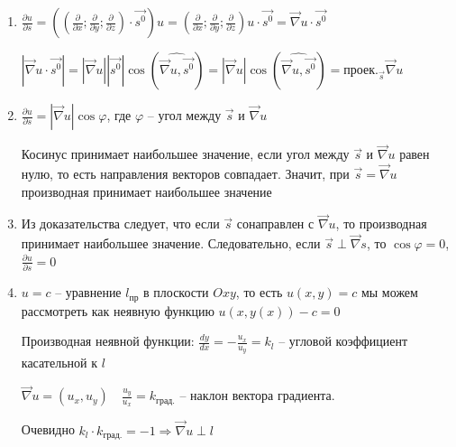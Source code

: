 \documentclass[12pt]{article}
\begin{document}
    \begin{enumerate}
        \item \begin{MyProof}
            $\frac{\partial u}{\partial s} = \left(\left(\frac{\partial}{\partial x}; \frac{\partial}{\partial y}; \frac{\partial}{\partial z}\right) \cdot \vec{s^0}\right) u = \left(\frac{\partial}{\partial x}; \frac{\partial}{\partial y}; \frac{\partial}{\partial z}\right) u \cdot \vec{s^0} =
            \vec\nabla u \cdot \vec{s^0}$
            
            $|\vec\nabla u \cdot \vec{s^0}| = |\vec\nabla u| |\vec{s^0}| \cos(\widehat{\vec\nabla u, \vec{s^0}}) =
            |\vec\nabla u| \cos(\widehat{\vec\nabla u, \vec{s^0}}) = \text{проек.}_{\vec{s}} \vec\nabla u$
        \end{MyProof}

        \item \begin{MyProof}
            $\frac{\partial u}{\partial s} = |\vec\nabla u| \cos\varphi$, где $\varphi$ -- угол между $\vec{s}$ и $\vec\nabla u$

            Косинус принимает наибольшее значение, если угол между $\vec{s}$ и $\vec\nabla u$ равен нулю, то есть направления векторов совпадает. Значит, при $\vec{s} = \vec\nabla u$ производная принимает наибольшее значение
        \end{MyProof}

        \item \begin{MyProof}
            Из доказательства  следует, что если $\vec{s}$ сонаправлен с $\vec\nabla u$, то производная принимает наибольшее значение. Следовательно, если $\vec{s} \perp \vec\nabla s$, то $\cos\varphi = 0$, $\frac{\partial u}{\partial s} = 0$
        \end{MyProof}

        \item \begin{MyProof}
            $u = c$ -- уравнение $l_{\text{пр}}$ в плоскости $Oxy$, то есть $u(x, y) = c$ мы можем рассмотреть как неявную функцию $u(x, y(x)) - c = 0$

            Производная неявной функции: $\frac{dy}{dx} = -\frac{u_x}{u_y} = k_l$ -- угловой коэффициент касательной к $l$

            $\vec\nabla u = (u_x, u_y) \quad \frac{u_y}{u_x} = k_{\text{град.}}$ -- наклон вектора градиента.

            Очевидно $k_l \cdot k_{\text{град.}} = -1 \Longrightarrow \vec\nabla u \perp l$
        \end{MyProof}
    \end{enumerate}
\end{document}
